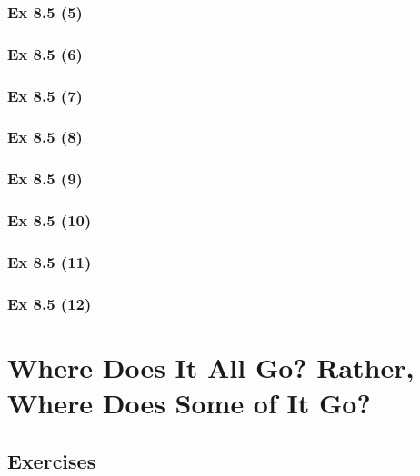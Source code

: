 \subsubsection{Ex 8.5 (5)}\label{sec:Ex_8.5.5}

\subsubsection{Ex 8.5 (6)}\label{sec:Ex_8.5.6}

\subsubsection{Ex 8.5 (7)}\label{sec:Ex_8.5.7}

\subsubsection{Ex 8.5 (8)}\label{sec:Ex_8.5.8}

\subsubsection{Ex 8.5 (9)}\label{sec:Ex_8.5.9}

\subsubsection{Ex 8.5 (10)}\label{sec:Ex_8.5.10}

\subsubsection{Ex 8.5 (11)}\label{sec:Ex_8.5.11}

\subsubsection{Ex 8.5 (12)}\label{sec:Ex_8.5.12}

\newpage		%

\section{Where Does It All Go? Rather, Where Does Some of It Go?}\label{sec:8.6}
\subsection{Exercises}\label{sec:8.6_Exercises}

